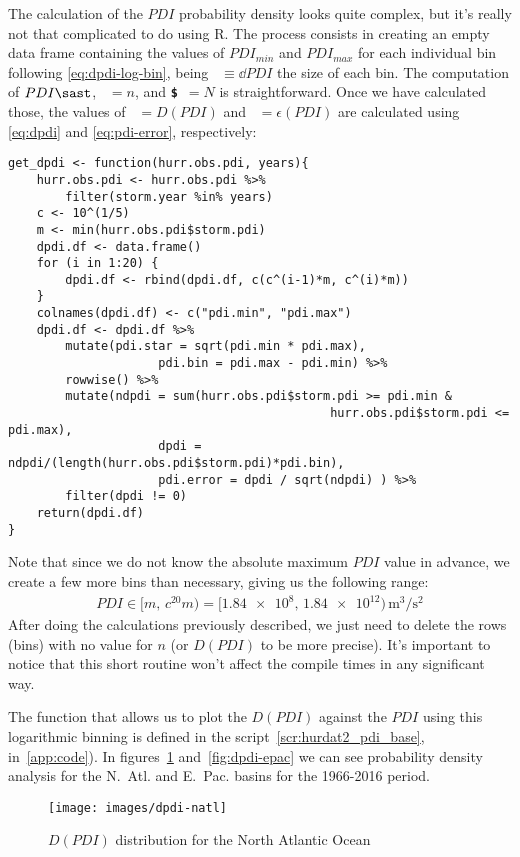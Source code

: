 \sk
The calculation of the $PDI$ probability density looks quite complex, but it's really not that complicated to do using R. The process consists in creating an empty data frame containing the values of $PDI_{min}$ and $PDI_{max}$ for each individual bin following \eqref{eq:dpdi-log-bin}, being ~$\equiv \dd{PDI}$ the size of each bin. The computation of $PDI\sast$, ~$= n$, and \texttt{\textbf{\$}}~$= N$ is straightforward. Once we have calculated those, the values of ~$= D(PDI)$ and ~$=\epsilon(PDI)$ are calculated using \eqref{eq:dpdi} and \eqref{eq:pdi-error}, respectively:
\begin{lstlisting}[caption=Function to calculate the $D(PDI)$ in a range of years, label=snp:hurdat-dpdi]
get_dpdi <- function(hurr.obs.pdi, years){
	hurr.obs.pdi <- hurr.obs.pdi %>%
		filter(storm.year %in% years)
	c <- 10^(1/5)
	m <- min(hurr.obs.pdi$storm.pdi)
	dpdi.df <- data.frame()
	for (i in 1:20) {
		dpdi.df <- rbind(dpdi.df, c(c^(i-1)*m, c^(i)*m))
	}
	colnames(dpdi.df) <- c("pdi.min", "pdi.max")
	dpdi.df <- dpdi.df %>%
		mutate(pdi.star = sqrt(pdi.min * pdi.max),
					 pdi.bin = pdi.max - pdi.min) %>%
		rowwise() %>%
		mutate(ndpdi = sum(hurr.obs.pdi$storm.pdi >= pdi.min &
											 hurr.obs.pdi$storm.pdi <= pdi.max),
					 dpdi = ndpdi/(length(hurr.obs.pdi$storm.pdi)*pdi.bin),
					 pdi.error = dpdi / sqrt(ndpdi) ) %>%
		filter(dpdi != 0)
	return(dpdi.df)
}
\end{lstlisting}
Note that since we do not know the absolute maximum $PDI$ value in advance, we create a few more bins than necessary, giving us the following range:
\begin{align*}
	PDI \in [ m, \, c^{20} m ) = [ \num{1.84 e8}, \, \num{1.84 e12})\, \si{\cubic\m\per\square\s}
\end{align*}
After doing the calculations previously described, we just need to delete the rows (bins) with no value for $n$ (or $D(PDI)$ to be more precise). It's important to notice that this short routine won't affect the compile times in any significant way.

The  function that allows us to plot the $D(PDI)$ against the $PDI$ using this logarithmic binning is defined in the script~\ref{scr:hurdat2_pdi_base}, in~\cref{app:code}). In figures~\ref{fig:dpdi-natl} and~\ref{fig:dpdi-epac} we can see probability density analysis for the N.~Atl. and E.~Pac. basins for the 1966-2016 period.
\begin{figure}[H]
	\centering
	\texttt{[image: images/dpdi-natl]}
	\caption{$D(PDI)$ distribution for the North Atlantic Ocean}
	\label{fig:dpdi-natl}
\end{figure}

